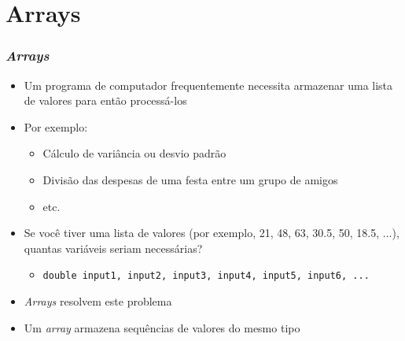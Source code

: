 \documentclass[xcolor={dvipsnames,table},aspectratio=169]{beamer}
\begin{document}
\section{Arrays}

\begin{frame}\frametitle{\emph{Arrays}}
\begin{itemize}
	\item Um programa de computador frequentemente necessita armazenar uma lista de valores para então processá-los
	\item Por exemplo:
	\begin{itemize}
		\item Cálculo de variância ou desvio padrão
		\item Divisão das despesas de uma festa entre um grupo de amigos
		\item etc.
	\end{itemize}
	\item Se você tiver uma lista de valores (por exemplo, 21, 48, 63, 30.5, 50, 18.5, ...), quantas variáveis seriam necessárias?
	\begin{itemize}
		\item \texttt{double input1, input2, input3, input4, input5, input6, ...}
	\end{itemize}
	\item \emph{Arrays} resolvem este problema
	\item Um \emph{array} armazena sequências de valores do mesmo tipo
\end{itemize}
\end{frame}
\end{document}
